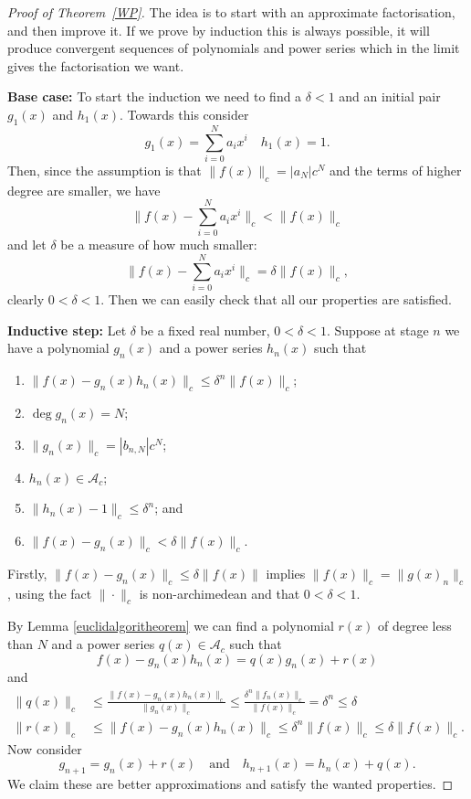 \begin{proof}[Proof of Theorem~\ref{WP}]
    The idea is to start with an approximate factorisation, and then improve it. If we prove by
    induction this is always possible, it will produce convergent sequences of polynomials and power
    series which in the limit gives the factorisation we want.

    \textbf{Base case:}
    To start the induction we need to find a $\delta < 1$ and an initial pair $g_1 (x)$ and
    $h_1 (x)$. Towards this consider
    \[
    g_1 (x) = \sum^{N}_{i = 0} a_i x^i \quad h_1(x) = 1.
    \]
    Then, since the assumption is that $\|f(x)\|_c = |a_N |c^N$ and the terms of higher degree are
    smaller, we have
    \[
    \| f(x) - \sum_{i=0}^N a_i x^i\|_c < \|f(x)\|_c
    \]
    and let $\delta$ be a measure of how much smaller:
    \[
    \|f(x) - \sum_{i=0}^N a_i x^i \|_c = \delta \|f(x) \|_c,
    \]
    clearly $0 < \delta < 1$. Then we can easily check that all our properties are satisfied.

    \textbf{Inductive step:}
    Let $\delta$ be a fixed real number, $0 < \delta < 1$. Suppose at stage $n$ we have a polynomial
    $g_n (x)$ and a power series $h_n (x)$ such that
    \begin{enumerate}
        \item $\|f(x) - g_n (x) h_n(x) \|_c \leq \delta^n \|f(x)\|_c$;
        \item $\deg g_n (x) = N$;
        \item $\|g_n(x) \|_c = |b_{n,N} | c^N$;
        \item $h_n (x) \in \mathcal{A}_c$;
        \item $\| h_n(x) - 1 \|_c \leq \delta^n$; and
        \item $\|f (x) - g_n (x) \|_c < \delta \|f(x)\|_c.$
    \end{enumerate}

    Firstly, $\|f(x) - g_n (x) \|_c \leq \delta \|f(x) \|$ implies $ \| f(x) \|_c = \| g(x)_n \|_c$,
    using the fact $\| \cdot \|_c$ is non-archimedean and that $0 < \delta < 1$.

    By Lemma \ref{euclidalgoritheorem} we can find a polynomial $r(x)$ of degree less than $N$ and a
    power series $q(x) \in \mathcal{A}_c$ such that
    \[
    f(x) - g_n (x) h_n (x) = q(x) g_n(x) + r(x)
    \]
    and
    \begin{align*}
    \| q(x) \|_c & \leq \frac{\| f(x) - g_n (x) h_n (x) \|_c}{\| g_n (x) \|_c} \leq
    \frac{\delta^n \|f_n(x)\|_c}{\|f(x) \|_c} = \delta^n \leq \delta\\
    \| r(x) \|_c &\leq \| f(x) - g_n (x) h_n (x) \|_c \leq
    \delta^n \| f(x) \|_c \leq \delta \| f(x) \|_c.
    \end{align*}
    Now consider
    \[
    g_{n+1} = g_n (x) + r(x) \quad \text{and} \quad h_{n+1}(x) = h_n (x) + q(x).
    \]
    We claim these are better approximations and satisfy the wanted properties.


\end{proof}
